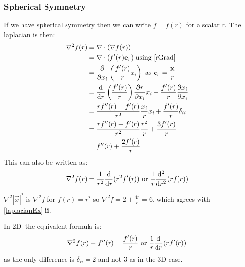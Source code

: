 \documentclass[../main.tex]{subfiles}
\begin{document}
\subsubsection{Spherical Symmetry}
\label{laplacianSphericalSymmetry}
If we have spherical symmetry then we can write $f = f(r)$ for a scalar $r$.
The laplacian is then:
\begin{align*}
  \nabla^2 f(r) &= \nabla \cdot (\nabla f(r)) \\
                &= \nabla \cdot (f'(r) \vec{e}_r) \text{ using \cref{rGrad}} \\
                &= \pderiv{}{x_i}\left(\frac{f'(r)}{r}x_i\right) \text{ as $\vec{e}_r = \frac{\vec{x}}{r}$}\\
                &= \deriv{}{r}\left(\frac{f'(r)}{r}\right)\pderiv{r}{x_i}x_i + \frac{f'(r)}{r}\pderiv{x_i}{x_i} \\
                &= \frac{r f''(r) - f'(r)}{r^2}\frac{x_i}{r}x_i + \frac{f'(r)}{r}\delta_{i i} \\
                &= \frac{rf''(r) - f'(r)}{r^2} \frac{r^2}{r} + \frac{3f'(r)}{r} \\
                &= f''(r) + \frac{2f'(r)}{r}
\end{align*}
This can also be written as:
\[
  \nabla^2 f(r) = \frac{1}{r^2} \deriv{}{r}(r^2 f'(r)) \text{ or } \frac{1}{r}\deriv[2]{}{r}(rf(r))
\]
\begin{example}
  $\nabla^2 |\vec{x}|^2$ is $\nabla^2 f$ for $f(r) = r^2$ so $\nabla^2 f = 2 + \frac{4r}{r} = 6$, which agrees with \cref{laplacianEx} \textbf{ii}.
\end{example}
In 2D, the equivalent formula is:
\[
  \nabla^2 f(r) = f''(r) + \frac{f'(r)}{r} \text{ or } \frac{1}{r} \deriv{}{r}(rf'(r))
\]
as the only difference is $\delta_{i i} = 2$ and not 3 as in the 3D case.
\end{document}
